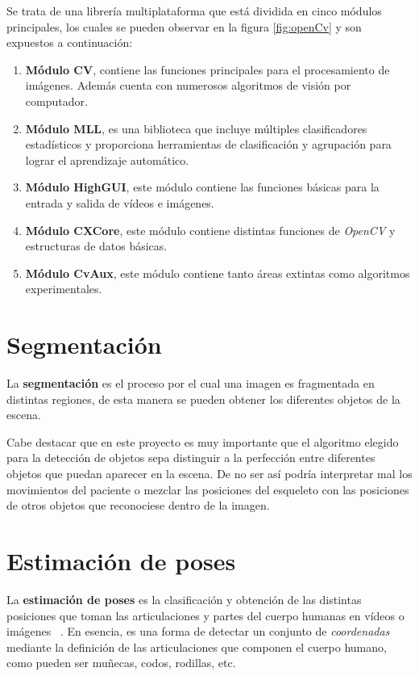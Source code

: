 Se trata de una librería multiplataforma que está dividida en cinco módulos principales, los cuales se pueden observar en la figura \ref{fig:openCv} y son expuestos a continuación:
\begin{enumerate}
    \item \textbf{Módulo CV}, contiene las funciones principales para el procesamiento de imágenes. Además cuenta con numerosos algoritmos de visión por computador.
    \item \textbf{Módulo MLL}, es una biblioteca que incluye múltiples clasificadores estadísticos y proporciona herramientas de clasificación y agrupación para lograr el aprendizaje automático.
    \item \textbf{Módulo HighGUI}, este módulo contiene las funciones básicas para la entrada y salida de vídeos e imágenes. 
    \item \textbf{Módulo CXCore}, este módulo contiene distintas funciones de \textit{OpenCV} y estructuras de datos básicas. 
    \item \textbf{Módulo CvAux}, este módulo contiene tanto áreas extintas como algoritmos experimentales. 
\end{enumerate}

\section{Segmentación}

La \textbf{segmentación} es el proceso por el cual una imagen es fragmentada en distintas regiones, de esta manera se pueden obtener los diferentes objetos de la escena. 

Cabe destacar que en este proyecto es muy importante que el algoritmo elegido para la detección de objetos sepa distinguir a la perfección entre diferentes objetos que puedan aparecer en la escena. De no ser así podría interpretar mal los movimientos del paciente o mezclar las posiciones del esqueleto con las posiciones de otros objetos que reconociese dentro de la imagen. 

\section{Estimación de poses}

La \textbf{estimación de poses} es la clasificación y obtención de las distintas posiciones que toman las articulaciones y partes del cuerpo humanas en vídeos o imágenes ~\cite{garcia2015vision}. 
En esencia, es una forma de detectar un conjunto de \emph{coordenadas} mediante la definición de las articulaciones que componen el cuerpo humano, como pueden ser muñecas, codos, rodillas, etc. 

